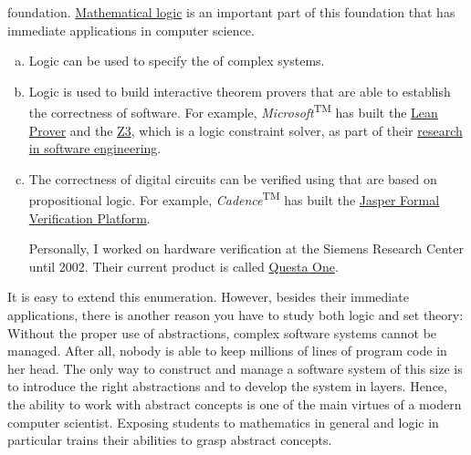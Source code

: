foundation.  \href{https://en.wikipedia.org/wiki/Mathematical_logic}{Mathematical logic} 
is an important part of this foundation that has immediate applications in computer science. 
\begin{enumerate}[(a)]
\item Logic can be used to specify the  of complex systems.  
\item Logic is used to build interactive theorem provers that are able to establish the correctness of
      software.  For example, \textsl{Microsoft}\textsuperscript{TM} has built the
      \href{https://leanprover.github.io}{Lean Prover} and the
      \href{https://www.microsoft.com/en-us/research/project/z3-3/}{Z3}, which is a logic constraint solver, as
      part of their 
      \href{https://www.microsoft.com/en-us/research/group/research-software-engineering-rise/}{research in
        software engineering}. 
\item The correctness of digital circuits can be verified using  that are based on
      propositional logic.  For example, \textsl{Cadence}\textsuperscript{TM} has built the
      \href{https://www.cadence.com/en_US/home/tools/system-design-and-verification/formal-and-static-verification.html}{Jasper
        Formal Verification Platform}.

      Personally, I worked on hardware verification at the Siemens Research Center until 2002.  Their current product
      is called \href{https://www.siemens.com/en-us/products/ic/questa-one/formal-verification/}{Questa One}.
\end{enumerate}
It is easy to extend this enumeration.  However, besides their immediate applications, 
there is another reason you have to study both logic and set theory: Without the proper use of
{\color{blue}abstractions}, complex software systems cannot be managed.  After all, nobody is able to keep
millions of lines of program code in her head.  The only way to construct and manage a software system of this
size is to introduce the right abstractions and to develop the system in layers.  Hence, the ability
to work with abstract concepts is one of the main virtues of a modern computer scientist.  
Exposing students to mathematics in general and logic in particular trains their abilities to grasp abstract concepts.

